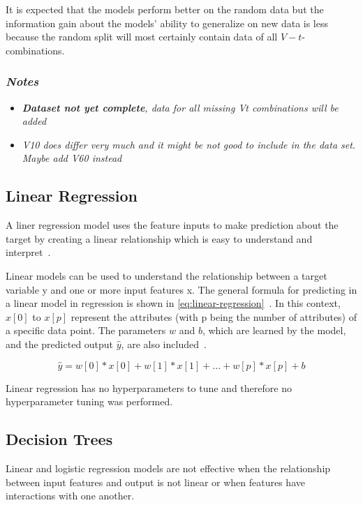 It is expected that the models perform better on the random data but the information gain about
the models' ability
to generalize on new data is less because the random split will most certainly contain data of
all $V-t$-combinations.

\subsubsection*{\textit{Notes}}
\begin{itemize}
    \item \textit{\textbf{Dataset not yet complete}, data for all missing Vt combinations will be
    added}
    \item \textit{V10 does differ very much and it might be not good to include in the data set.
    Maybe add V60 instead}
\end{itemize}

\subsection{Linear Regression}\label{subsec:linear-regression}
A liner regression model uses the feature inputs to make prediction about the target by
creating a linear relationship which is easy to understand and interpret~\cite[p.
37]{molnar2020interpretable}.

Linear models can be used to understand the relationship between a target variable y and one or
more input features x.
The general formula for predicting in a linear model in regression is shown in
\ref{eq:linear-regression}~\cite[p. 45]{muller_introductionmachinelearning_2016}.
In this context, $x[0]$ to $x[p]$ represent the attributes (with p being the number of
attributes) of
a specific data point. The parameters $w$ and $b$, which are learned by the model, and the predicted
output $\hat{y}$, are also included~\cite[p. 45]{muller_introductionmachinelearning_2016}.

\begin{tcolorbox}[arc=0pt,boxrule=0.5pt]
    \begin{equation}
        \hat{y} = w[0] * x[0] + w[1] * x[1] + ... + w[p] * x[p] + b
    \end{equation}
    \label{eq:linear-regression}
\end{tcolorbox}

Linear regression has no hyperparameters to tune and therefore no hyperparameter tuning was
performed.

\subsection{Decision Trees}\label{subsec:decision-trees}
Linear and logistic regression models are not effective when the relationship between input
features and output is not linear or when features have interactions with one another.

